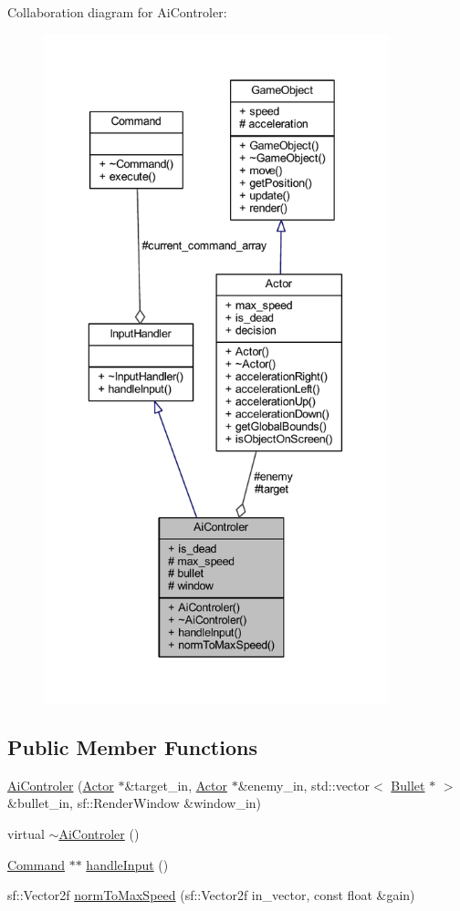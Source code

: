 Collaboration diagram for Ai\+Controler\+:
\nopagebreak
\begin{figure}[H]
\begin{center}
\leavevmode
\includegraphics[height=550pt]{class_ai_controler__coll__graph}
\end{center}
\end{figure}
\subsection*{Public Member Functions}
\begin{DoxyCompactItemize}
\item 
\hyperlink{class_ai_controler_a33bdaad21e07f2d93ae0ea277035193b}{Ai\+Controler} (\hyperlink{class_actor}{Actor} $\ast$\&target\+\_\+in, \hyperlink{class_actor}{Actor} $\ast$\&enemy\+\_\+in, std\+::vector$<$ \hyperlink{class_bullet}{Bullet} $\ast$ $>$ \&bullet\+\_\+in, sf\+::\+Render\+Window \&window\+\_\+in)
\item 
virtual \hyperlink{class_ai_controler_aa58de5f8ccbff5d293c57cdf2a80e8c5}{$\sim$\+Ai\+Controler} ()
\item 
\hyperlink{class_command}{Command} $\ast$$\ast$ \hyperlink{class_ai_controler_a72b3ad15dcd00ef8285c299bee09e89d}{handle\+Input} ()
\item 
sf\+::\+Vector2f \hyperlink{class_ai_controler_aa388145d3791cd80b1d53a5847428f68}{norm\+To\+Max\+Speed} (sf\+::\+Vector2f in\+\_\+vector, const float \&gain)
\end{DoxyCompactItemize}
